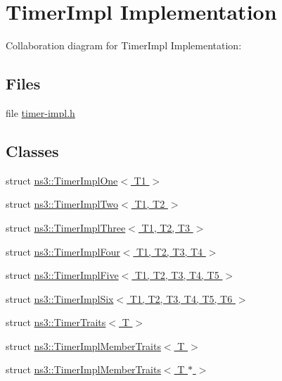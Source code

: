\hypertarget{group__timerimpl}{}\section{Timer\+Impl Implementation}
\label{group__timerimpl}
Collaboration diagram for Timer\+Impl Implementation\+:
\subsection*{Files}
\begin{DoxyCompactItemize}
\item 
file \hyperlink{timer-impl_8h}{timer-\/impl.\+h}
\end{DoxyCompactItemize}
\subsection*{Classes}
\begin{DoxyCompactItemize}
\item 
struct \hyperlink{structns3_1_1TimerImplOne}{ns3\+::\+Timer\+Impl\+One$<$ T1 $>$}
\item 
struct \hyperlink{structns3_1_1TimerImplTwo}{ns3\+::\+Timer\+Impl\+Two$<$ T1, T2 $>$}
\item 
struct \hyperlink{structns3_1_1TimerImplThree}{ns3\+::\+Timer\+Impl\+Three$<$ T1, T2, T3 $>$}
\item 
struct \hyperlink{structns3_1_1TimerImplFour}{ns3\+::\+Timer\+Impl\+Four$<$ T1, T2, T3, T4 $>$}
\item 
struct \hyperlink{structns3_1_1TimerImplFive}{ns3\+::\+Timer\+Impl\+Five$<$ T1, T2, T3, T4, T5 $>$}
\item 
struct \hyperlink{structns3_1_1TimerImplSix}{ns3\+::\+Timer\+Impl\+Six$<$ T1, T2, T3, T4, T5, T6 $>$}
\item 
struct \hyperlink{structns3_1_1TimerTraits}{ns3\+::\+Timer\+Traits$<$ T $>$}
\item 
struct \hyperlink{structns3_1_1TimerImplMemberTraits}{ns3\+::\+Timer\+Impl\+Member\+Traits$<$ T $>$}
\item 
struct \hyperlink{structns3_1_1TimerImplMemberTraits_3_01T_01_5_01_4}{ns3\+::\+Timer\+Impl\+Member\+Traits$<$ T $\ast$ $>$}
\end{DoxyCompactItemize}
